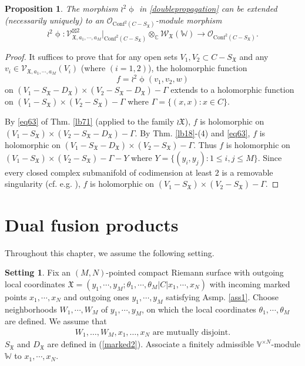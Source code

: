 \documentclass[11pt,b5paper,notitlepage]{article}
\theoremstyle{definition}
\newtheorem{sett}[df]{Setting}
\theoremstyle{plain}
\newtheorem{pp}[df]{Proposition}
\newcommand{\fk}{\mathfrak}
\newcommand{\Conf}{\mathrm{Conf}}
\newcommand{\SV}{\mathscr{V}}
\newcommand{\SX}{{S_{\fk X}}}
\newcommand{\DX}{D_{\fk X}}
\newcommand{\Vbb}{\mathbb V}
\newcommand{\Wbb}{\mathbb W}
\newcommand{\Cbb}{\mathbb C}
\newcommand{\<}{\left\langle}
\renewcommand{\>}{\right\rangle}
\newcommand{\MO}{\mathcal{O}}
\newcommand{\fx}{\mathfrak{X}}
\newcommand{\SW}{\mathscr{W}}
\numberwithin{equation}{section}
\begin{document}
\begin{pp}\label{anotherversionpropagation2}
The morphism $\wr^2\upphi$ in \eqref{doublepropagation} can be extended (necessarily uniquely) to an  $\MO_{\Conf^2(C-S_\fx)}$-module morphism
\begin{equation}\label{doublepropagation2}
\wr^2\upphi:\SV_{\fx,a_1,\cdots,a_M}^{\boxtimes 2}\vert_{\Conf^2(C-S_\fx)}\otimes_\Cbb \SW_\fx(\Wbb)\rightarrow \MO_{\Conf^2(C-S_\fx)}.
\end{equation}
\end{pp}
\begin{proof}
It suffices to prove that for any open sets $V_1,V_2\subset C-S_\fx$ and any  $v_i\in \SV_{\fx,a_1,\cdots,a_M}(V_i)$ (where $(i=1,2)$), the holomorphic function
\begin{equation}\label{proofdoublepropagation2}
f=\wr^2\upphi(v_1,v_2,w)
\end{equation}
on $(V_1-\SX-\DX)\times(V_2-\SX-\DX)-\Gamma$ extends to a holomorphic function on $(V_1-\SX)\times(V_2-\SX)-\Gamma$ where $\Gamma=\{(x,x):x\in C\}$. 

By \eqref{eq63} of Thm. \ref{lb71} (applied to the family $\wr\fk X$), $f$ is holomorphic on $(V_1-\SX)\times(V_2-\SX-\DX)-\Gamma$. By Thm. \ref{lb18}-(4) and \eqref{eq63}, $f$ is holomorphic on $(V_1-\SX-\DX)\times (V_2-\SX)-\Gamma$. Thus $f$ is holomorphic on $(V_1-\SX)\times(V_2-\SX)-\Gamma-Y$ where $Y=\{(y_i,y_j):1\leq i,j\leq M\}$. Since every closed complex submanifold of codimension at least $2$ is a removable singularity   (cf. e.g. \cite[Thm. 7.1.2]{GR84}), $f$ is holomorphic on $(V_1-\SX)\times(V_2-\SX)-\Gamma$.
\end{proof}















\section{Dual fusion products}


Throughout this chapter, we assume the following setting.


\begin{sett}\label{lb24}
Fix an $(M,N)$-pointed compact Riemann surface with outgoing local coordinates $\fx=(y_1,\cdots,y_M;\theta_1,\cdots,\theta_M\big|C\big|x_1,\cdots,x_N)$ with incoming marked points $x_1,\cdots,x_N$ and outgoing ones $y_1,\cdots,y_M$ satisfying Asmp. \ref{ass1}.  Choose neighborhoods $W_1,\cdots,W_M$ of $y_1,\cdots,y_M$, on which the local coordinates $\theta_1,\cdots,\theta_M$ are defined. We assume that
\begin{align}
W_1,\dots,W_M,x_1,\dots,x_N\text{ are mutually disjoint}.
\end{align}
$S_\fx$ and $D_\fx$ are defined in (\ref{marked2}). Associate a finitely admissible $\Vbb^{\times N}$-module $\Wbb$ to $x_1,\cdots,x_N$.
\end{sett}
\end{document}
